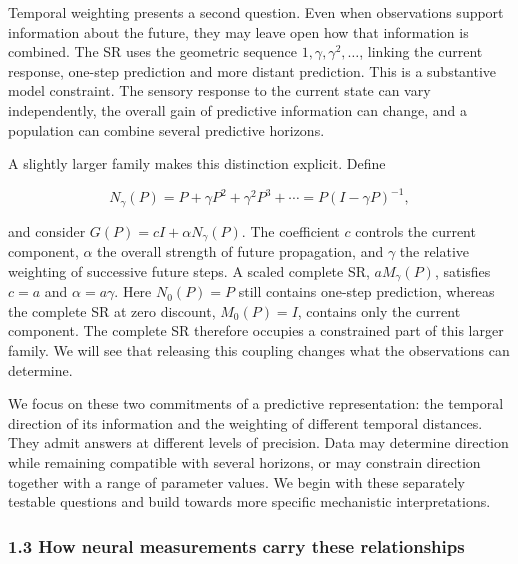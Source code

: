 \documentclass[11pt,a4paper]{article}
\begin{document}
Temporal weighting presents a second question. Even when observations
support information about the future, they may leave open how that
information is combined. The SR uses the geometric sequence
\(1,\gamma,\gamma^2,\ldots\), linking the current response, one-step
prediction and more distant prediction. This is a substantive model
constraint. The sensory response to the current state can vary
independently, the overall gain of predictive information can change,
and a population can combine several predictive horizons.

\par
\noindent\begin{minipage}{\linewidth}

A slightly larger family makes this distinction explicit. Define

\[
N_\gamma(P)=P+\gamma P^2+\gamma^2P^3+\cdots
=P(I-\gamma P)^{-1},
\]

\end{minipage}\par

and consider \(G(P)=cI+\alpha N_\gamma(P)\). The coefficient \(c\)
controls the current component, \(\alpha\) the overall strength of
future propagation, and \(\gamma\) the relative weighting of successive
future steps. A scaled complete SR, \(aM_\gamma(P)\), satisfies \(c=a\)
and \(\alpha=a\gamma\). Here \(N_0(P)=P\) still contains one-step
prediction, whereas the complete SR at zero discount, \(M_0(P)=I\),
contains only the current component. The complete SR therefore occupies
a constrained part of this larger family. We will see that releasing
this coupling changes what the observations can determine.

We focus on these two commitments of a predictive representation: the
temporal direction of its information and the weighting of different
temporal distances. They admit answers at different levels of precision.
Data may determine direction while remaining compatible with several
horizons, or may constrain direction together with a range of parameter
values. We begin with these separately testable questions and build
towards more specific mechanistic interpretations.

\subsubsection{1.3 How neural measurements carry these
relationships}\label{how-neural-measurements-carry-these-relationships}
\end{document}
